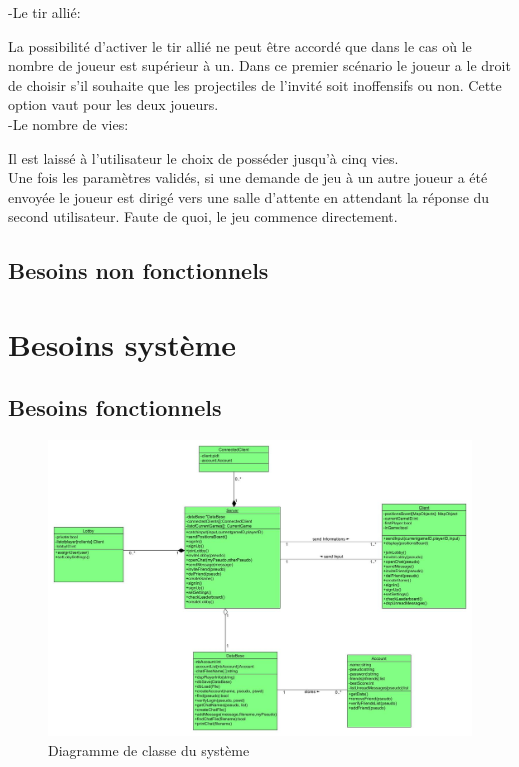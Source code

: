 \documentclass[a4paper,12pt]{article}
\begin{document}
-Le tir allié: 

La possibilité d'activer le tir allié ne peut être accordé que dans le cas où le nombre de joueur est supérieur à un.
Dans ce premier scénario le joueur a le droit de choisir s'il souhaite que les projectiles de l'invité soit inoffensifs ou non. Cette option vaut pour les deux joueurs. \\

-Le nombre de vies: 

Il est laissé à l'utilisateur le choix de posséder jusqu'à cinq vies. \\

Une fois les paramètres validés, si une demande de jeu à un autre joueur a été envoyée le joueur est dirigé vers une salle d'attente en attendant la réponse du second utilisateur. Faute de quoi, le jeu commence directement.

\subsection{Besoins non fonctionnels}

\newpage

\section{Besoins système}
\subsection{Besoins fonctionnels}
\begin{figure}[h!]
\centering
\includegraphics[width=16cm]{newSystemClassDiagram.jpg}
\caption{Diagramme de classe du système}
\label{fig:UerUseCase}
\end{figure}
\end{document}
